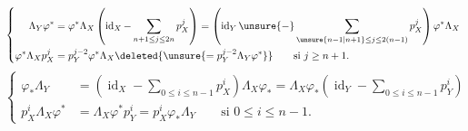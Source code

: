 \[
\left\{\begin{aligned}
\Lambda_Y\varphi^*&=\varphi^*\Lambda_X\left(\operatorname{id}_X-\sum_{n+1\leq j\leq2n}p_X^j\right)
=\left(\operatorname{id}_Y\unsure{-}\sum_{\unsure{n-1|n+1}\leq j\leq2(n-1)}p_X^j\right)\varphi^*\Lambda_X\\
\varphi^*\Lambda_Xp_X^j&=p_Y^{j-2}\varphi^*\Lambda_X\deleted{\unsure{=p_Y^{j-2}\Lambda_Y\varphi^*}}
\qquad\text{si }j\geq n+1.
\end{aligned}\right.
\]
\[
\left\{\begin{aligned}
\varphi_*\Lambda_Y&=\left(\operatorname{id}_X-\sum_{0\leq i\leq n-1}p_X^i\right)\Lambda_X\varphi_*
=\Lambda_X\varphi_*\left(\operatorname{id}_Y-\sum_{0\leq i\leq n-1}p_Y^i\right)\\
p_X^i\Lambda_X\varphi^*&=\Lambda_X\varphi^*p_Y^i=p_X^i\varphi_*\Lambda_Y\qquad\text{si }0\leq i\leq n-1.
\end{aligned}\right.
\]
